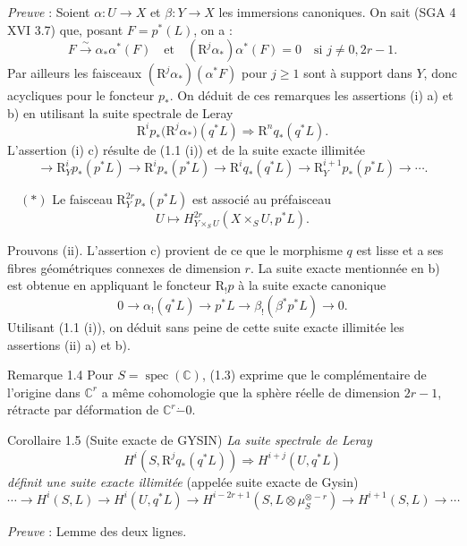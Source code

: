 \emph{Preuve} : Soient $\alpha:U\to X$ et $\beta:Y\to X$ les immersions canoniques. On sait (SGA 4 XVI 3.7) que, posant $F=p^*(L)$, on a :
\[
F\xrightarrow{\sim}\alpha_*\alpha^*(F)
\quad\text{et}\quad
(\mathrm{R}^j\alpha_*)\alpha^*(F)=0\quad\text{si }j\ne0,2r-1.
\]
Par ailleurs les faisceaux $(\mathrm{R}^j\alpha_*)(\alpha^*F)$ pour $j\ge1$ sont à support dans $Y$, donc acycliques pour le foncteur $p_*$. On déduit de ces remarques les assertions (i) a) et b) en utilisant la suite spectrale de Leray
\[
\mathrm{R}^i p_*\bigl(\mathrm{R}^j\alpha_*\bigr)(q^*L)\Longrightarrow \mathrm{R}^n q_*(q^*L).
\]
L'assertion (i) c) résulte de (1.1 (i)) et de la suite exacte illimitée
\[
\longrightarrow \mathrm{R}_Y^i p_*(p^*L)\longrightarrow \mathrm{R}^i p_*(p^*L)\longrightarrow \mathrm{R}^i q_*(q^*L)
\longrightarrow \mathrm{R}_Y^{i+1}p_*(p^*L)\longrightarrow\cdots.
\]

\(\quad (*)\) Le faisceau $\mathrm{R}_Y^{2r}p_*(p^*L)$ est associé au préfaisceau
\[
U\longmapsto H^{2r}_{Y\times_S U}(X\times_S U,p^*L).
\]

Prouvons (ii). L'assertion c) provient de ce que le morphisme $q$ est lisse et a ses fibres géométriques connexes de dimension $r$. La suite exacte mentionnée en b) est obtenue en appliquant le foncteur $\mathrm{R}_!p$ à la suite exacte canonique
\[
0\longrightarrow \alpha_!(q^*L)\longrightarrow p^*L\longrightarrow \beta_!(\beta^*p^*L)\longrightarrow 0.
\]
Utilisant (1.1 (i)), on déduit sans peine de cette suite exacte illimitée les assertions (ii) a) et b).

\begin{statement}{Remarque 1.4}
Pour $S=\operatorname{spec}(\mathbb{C})$, (1.3) exprime que le complémentaire de l'origine dans $\mathbb{C}^r$ a même cohomologie que la sphère réelle de dimension $2r-1$, rétracte par déformation de $\mathbb{C}^r\mathbin{\dot{-}}0$.
\end{statement}

\begin{statement}{Corollaire 1.5 (Suite exacte de GYSIN)}
\emph{La suite spectrale de Leray}
\[
H^i(S,\mathrm{R}^j q_*(q^*L))\Rightarrow H^{i+j}(U,q^*L)
\]
\emph{définit une suite exacte illimitée} (appelée suite exacte de Gysin)
\[
\cdots\longrightarrow H^i(S,L)\longrightarrow H^i(U,q^*L)\longrightarrow
H^{i-2r+1}(S,L\otimes\mu_S^{\otimes -r})\longrightarrow H^{i+1}(S,L)\longrightarrow\cdots
\]
\end{statement}

\emph{Preuve} : Lemme des deux lignes.

